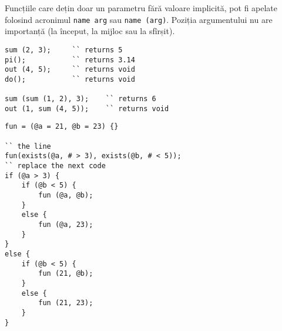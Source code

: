 Funcțiile care dețin doar un parametru fără valoare implicită, pot fi apelate folosind acronimul \lstinline|name arg| sau \lstinline|name (arg)|. Poziția argumentului nu are importanță (la început, la mijloc sau la sfîrșit).

\begin{lstlisting}[caption=Apeluri de funcții, label=callfunc]
sum (2, 3); 	`` returns 5
pi();			`` returns 3.14
out (4, 5); 	`` returns void
do();			`` returns void

sum (sum (1, 2), 3);	`` returns 6
out (1, sum (4, 5));	`` returns void
\end{lstlisting}

\newpage
\begin{lstlisting}[caption=Valori predefinite, label=defaultparametrs]
fun = (@a = 21, @b = 23) {}

`` the line 
fun(exists(@a, # > 3), exists(@b, # < 5));
`` replace the next code
if (@a > 3) {
	if (@b < 5) {
		fun (@a, @b);
	}
	else {
		fun (@a, 23);
	}
}
else {
	if (@b < 5) {
		fun (21, @b);
	}
	else {
		fun (21, 23);
	}
}
\end{lstlisting}

